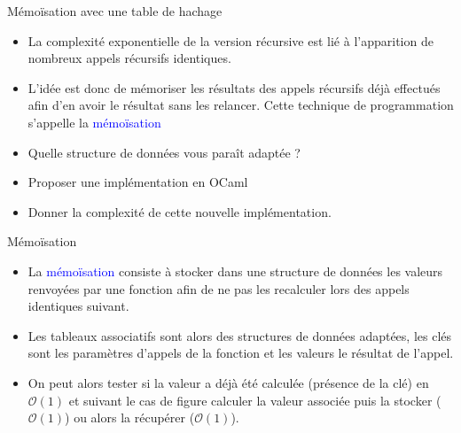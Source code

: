 \documentclass[10pt]{beamer}
\begin{document}
\begin{frame}{\Ctitle}{\stitle}
	\begin{block}{Mémoïsation avec une table de hachage}
		\begin{itemize}
			\item<1-> La complexité exponentielle de la version récursive est lié à l'apparition de nombreux appels récursifs identiques.
			\item<2-> L'idée est donc de mémoriser les résultats des appels récursifs déjà effectués afin d'en avoir le résultat sans les relancer. Cette technique de programmation s'appelle la \textcolor{blue}{mémoïsation}
			\item<3-> Quelle structure de données vous paraît adaptée ?
			\item<4-> Proposer une implémentation en OCaml
			\item<5-> Donner la complexité de cette nouvelle implémentation.
		\end{itemize}
	\end{block}
\end{frame}

\begin{frame}{\Ctitle}{\stitle}
	\begin{alertblock}{Mémoïsation}
		\begin{itemize}
			\item<1-> La \textcolor{blue}{mémoïsation} consiste à stocker dans une structure de données les valeurs renvoyées par une fonction afin de ne pas les recalculer lors des appels identiques suivant.\\
			\item<2-> Les tableaux associatifs sont alors des structures de données adaptées, les clés sont les paramètres d'appels de la fonction et les valeurs le résultat de l'appel.
			\item<3-> On peut alors tester si la valeur a déjà été calculée (présence de la clé) en $\mathcal{O}(1)$ et suivant le cas de figure calculer la valeur associée puis la stocker ($\mathcal{O}(1)$) ou alors la récupérer ($\mathcal{O}(1)$).
		\end{itemize}
	\end{alertblock}
\end{frame}
\end{document}
